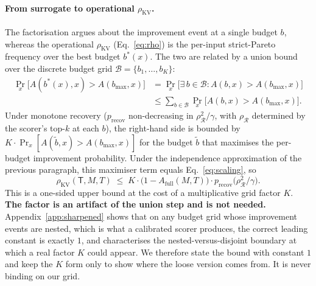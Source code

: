 \paragraph{From surrogate to operational $\rho_{\mathrm{KV}}$.} The
factorisation argues about the improvement event at a single budget $b$,
whereas the operational $\rho_{\mathrm{KV}}$ (Eq.~\eqref{eq:rho}) is the
per-input strict-Pareto frequency over the best budget $b^{*}(x)$. The
two are related by a union bound over the discrete budget grid $\mathcal{B}
= \{b_1, \dots, b_K\}$:
\begin{align*}
\Pr_x\bigl[A(b^{*}(x), x) > A(b_{\max}, x)\bigr]
&= \Pr_x\bigl[\exists\, b \in \mathcal{B} : A(b, x) > A(b_{\max}, x)\bigr] \\
&\le \sum_{b \in \mathcal{B}} \Pr_x\bigl[A(b, x) > A(b_{\max}, x)\bigr].
\end{align*}
Under monotone recovery ($p_{\mathrm{recov}}$ non-decreasing in
$\rho_{\mathcal{R}}^2/\gamma$, with $\rho_{\mathcal{R}}$ determined by the
scorer's top-$k$ at each $b$), the right-hand side is bounded by
$K \cdot \Pr_x[A(\widetilde b, x) > A(b_{\max}, x)]$ for the budget
$\widetilde b$ that maximises the per-budget improvement probability.
Under the independence approximation of the previous paragraph, this
maximiser term equals Eq.~\eqref{eq:scaling}, so
\[
\rho_{\mathrm{KV}}(\mathsf{T}, M, T)
\;\le\; K \cdot \bigl(1 - A_{\mathrm{full}}(M, T)\bigr)
\cdot p_{\mathrm{recov}}\bigl(\rho_{\mathcal{R}}^2 / \gamma\bigr).
\]
This is a one-sided upper bound at the cost of a multiplicative grid factor
$K$. \textbf{The factor is an artifact of the union step and is not needed.}
Appendix~\ref{app:sharpened} shows that on any budget grid whose improvement
events are nested, which is what a calibrated scorer produces, the correct
leading constant is exactly $1$, and characterises the nested-versus-disjoint
boundary at which a real factor $K$ could appear. We therefore state the
bound with constant $1$ and keep the $K$ form only to show where the loose
version comes from. It is never binding on our grid.

